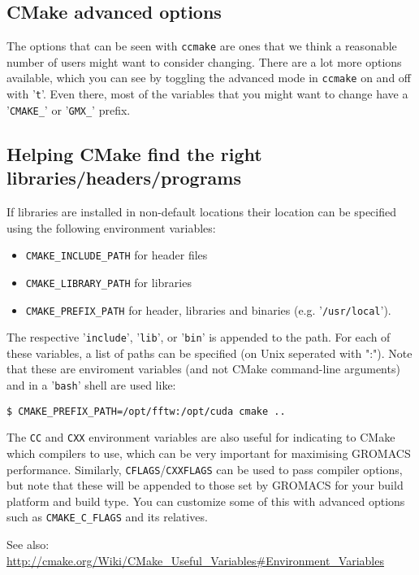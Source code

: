 \documentclass{article}[12pt,a4paper,twoside]
\newcommand{\gromacs}{GROMACS}
\newcommand{\cmake}{CMake}
\begin{document}
\subsection{CMake advanced options}
The options that can be seen with \texttt{ccmake} are ones that we
think a reasonable number of users might want to consider
changing. There are a lot more options available, which you can see by
toggling the advanced mode in \texttt{ccmake} on and off with
'\verb+t+'. Even there, most of the variables that you might want to
change have a '\verb+CMAKE_+' or '\verb+GMX_+' prefix.

\subsection{Helping CMake find the right libraries/headers/programs}

If libraries are installed in non-default locations their location can
be specified using the following environment variables:
\begin{itemize}
\item \texttt{CMAKE\_INCLUDE\_PATH} for header files
\item \texttt{CMAKE\_LIBRARY\_PATH} for libraries
\item \texttt{CMAKE\_PREFIX\_PATH} for header, libraries and binaries
  (e.g. '\verb+/usr/local+').
\end{itemize}
The respective '\verb+include+', '\verb+lib+', or '\verb+bin+' is
appended to the path. For each of these variables, a list of paths can
be specified (on Unix seperated with ":"). Note that these are
enviroment variables (and not \cmake{} command-line arguments) and in
a '\verb+bash+' shell are used like:
\begin{verbatim}
$ CMAKE_PREFIX_PATH=/opt/fftw:/opt/cuda cmake ..
\end{verbatim}

The \texttt{CC} and \texttt{CXX} environment variables are also useful
for indicating to \cmake{} which compilers to use, which can be very
important for maximising \gromacs{} performance. Similarly,
\texttt{CFLAGS}/\texttt{CXXFLAGS} can be used to pass compiler
options, but note that these will be appended to those set by
\gromacs{} for your build platform and build type. You can customize
some of this with advanced options such as \texttt{CMAKE\_C\_FLAGS}
and its relatives.

See also: \url{http://cmake.org/Wiki/CMake_Useful_Variables#Environment_Variables}
\end{document}
